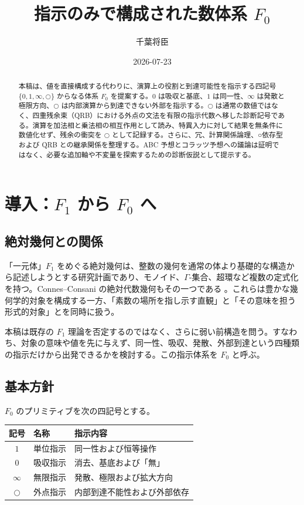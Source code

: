 \documentclass[a4paper,11pt]{ltjsarticle}
\title{指示のみで構成された数体系 \texorpdfstring{$F_0$}{F0}}
\author{千葉将臣}
\date{2026-07-23}
\theoremstyle{definition}
\theoremstyle{plain}
\newcommand{\dfix}{\bigcirc}
\newcommand{\Fzero}{F_{0}}
\begin{document}
\maketitle

\begin{abstract}
本稿は、値を直接構成する代わりに、演算上の役割と到達可能性を指示する四記号 $\{0,1,\infty,\dfix\}$ からなる体系 $\Fzero$ を提案する。$0$ は吸収と基底、$1$ は同一性、$\infty$ は発散と極限方向、$\dfix$ は内部演算から到達できない外部を指示する。$\dfix$ は通常の数値ではなく、四重残余束（QRB）における外点の文法を有限の指示代数へ移した診断記号である。演算を加法相と乗法相の相互作用として読み、特異入力に対して結果を無条件に数値化せず、残余の衝突を $\dfix$ として記録する。さらに、冗、計算関係論理、○依存型および QRB との継承関係を整理する。ABC 予想とコラッツ予想への議論は証明ではなく、必要な追加軸や不変量を探索するための診断仮説として提示する。
\end{abstract}

\section{導入：\texorpdfstring{$F_1$}{F1} から \texorpdfstring{$F_0$}{F0} へ}

\subsection{絶対幾何との関係}

「一元体」$F_1$ をめぐる絶対幾何は、整数の幾何を通常の体より基礎的な構造から記述しようとする研究計画であり、モノイド、$\Gamma$-集合、超環など複数の定式化を持つ。Connes--Consani の絶対代数幾何もその一つである \cite{ConnesConsani2020}。これらは豊かな幾何学的対象を構成する一方、「素数の場所を指し示す直観」と「その意味を担う形式的対象」とを同時に扱う。

本稿は既存の $F_1$ 理論を否定するのではなく、さらに弱い前構造を問う。すなわち、対象の意味や値を先に与えず、同一性、吸収、発散、外部到達という四種類の指示だけから出発できるかを検討する。この指示体系を $\Fzero$ と呼ぶ。

\subsection{基本方針}

$\Fzero$ のプリミティブを次の四記号とする。

\begin{center}
\begin{tabular}{c l p{}}
\toprule
記号 & 名称 & 指示内容 \\
\midrule
$1$ & 単位指示 & 同一性および恒等操作 \\
$0$ & 吸収指示 & 消去、基底および「無」 \\
$\infty$ & 無限指示 & 発散、極限および拡大方向 \\
$\dfix$ & 外点指示 & 内部到達不能性および外部依存 \\
\bottomrule
\end{tabular}
\end{center}
\end{document}
